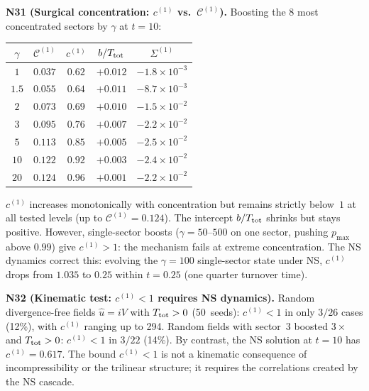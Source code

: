 \documentclass[11pt]{article}
\theoremstyle{definition}
\newcommand{\cC}{\mathcal{C}}
\begin{document}
\medskip\noindent\textbf{N31 (Surgical concentration:
$c^{(1)}$ vs.\ $\cC^{(1)}$).}
Boosting the 8 most concentrated sectors by $\gamma$ at
$t=10$:
\begin{center}
\renewcommand{\arraystretch}{1.2}
\begin{tabular}{@{}ccccc@{}}
\toprule
$\gamma$ & $\cC^{(1)}$ & $c^{(1)}$
  & $b/T_{\rm tot}$ & $\Sigma^{(1)}$ \\
\midrule
$1$ & $0.037$ & $0.62$ & $+0.012$ & $-1.8\!\times\!10^{-3}$ \\
$1.5$ & $0.055$ & $0.64$ & $+0.011$ & $-8.7\!\times\!10^{-3}$ \\
$2$ & $0.073$ & $0.69$ & $+0.010$ & $-1.5\!\times\!10^{-2}$ \\
$3$ & $0.095$ & $0.76$ & $+0.007$ & $-2.2\!\times\!10^{-2}$ \\
$5$ & $0.113$ & $0.85$ & $+0.005$ & $-2.5\!\times\!10^{-2}$ \\
$10$ & $0.122$ & $0.92$ & $+0.003$ & $-2.4\!\times\!10^{-2}$ \\
$20$ & $0.124$ & $0.96$ & $+0.001$ & $-2.2\!\times\!10^{-2}$ \\
\bottomrule
\end{tabular}
\end{center}
$c^{(1)}$ increases monotonically with concentration but
remains strictly below~$1$ at all tested levels
(up to $\cC^{(1)}=0.124$).  The intercept $b/T_{\rm tot}$
shrinks but stays positive.  However, single-sector
boosts ($\gamma=50$--$500$ on one sector, pushing $p_{\max}$
above $0.99$) give $c^{(1)}>1$: the mechanism fails at
extreme concentration.  The NS dynamics correct this:
evolving the $\gamma=100$ single-sector state under NS,
$c^{(1)}$ drops from $1.035$ to $0.25$ within $t=0.25$
(one quarter turnover time).

\medskip\noindent\textbf{N32 (Kinematic test:
$c^{(1)}<1$ requires NS dynamics).}
Random divergence-free fields $\hat u = iV$ with
$T_{\rm tot}>0$ (50~seeds): $c^{(1)}<1$ in only $3/26$
cases (12\%), with $c^{(1)}$ ranging up to 294.
Random fields with sector~3 boosted $3\times$ and
$T_{\rm tot}>0$: $c^{(1)}<1$ in $3/22$ (14\%).
By contrast, the NS solution at $t=10$ has
$c^{(1)}=0.617$.  The bound $c^{(1)}<1$ is not a
kinematic consequence of incompressibility or
the trilinear structure; it requires the
correlations created by the NS cascade.
\end{document}
